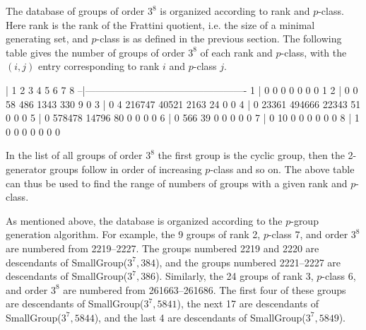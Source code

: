 
The database of groups of order $3^{8}$ is organized according to rank and 
$p$-class. Here rank is the rank of the Frattini quotient, i.e. the size of
a minimal generating set, and $p$-class is as defined in the previous
section. The following table gives the number of groups of order $3^{8}$ of
each rank and $p$-class, with the $(i,j)$ entry corresponding to rank $i$
and $p$-class $j$.

\beginexample
  | 1   2        3        4       5      6     7   8
--|-------------------------------------------------
1 | 0   0        0        0       0      0     0   1 
2 | 0   0        58       486     1343   330   9   0 
3 | 0   4        216747   40521   2163   24    0   0 
4 | 0   23361    494666   22343   51     0     0   0
5 | 0   578478   14796    80      0      0     0   0 
6 | 0   566      39       0       0      0     0   0 
7 | 0   10       0        0       0      0     0   0 
8 | 1   0        0        0       0      0     0   0
\endexample

In the list of all groups of order $3^8$ the first group is the cyclic
group, then the 2-generator groups follow in order of increasing $p$-class
and so on. The above table can thus be used to find the range of numbers
of groups with a given rank and $p$-class.

As mentioned above, the database is organized according to the $p$-group
generation algorithm. For example, the 9 groups of rank 2, $p$-class 7, and
order $3^{8}$ are numbered from 2219--2227. The groups numbered 2219 and
2220 are descendants of SmallGroup($3^{7},384$), and the groups numbered
2221--2227 are descendants of SmallGroup($3^{7},386$). Similarly, the 24
groups of rank 3, $p$-class 6, and order $3^{8}$ are numbered from
261663--261686. The first four of these groups are descendants of 
SmallGroup($3^{7},5841$), the next 17 are descendants of 
SmallGroup($3^{7},5844$), and the last 4 are descendants of 
SmallGroup($3^{7},5849$).


